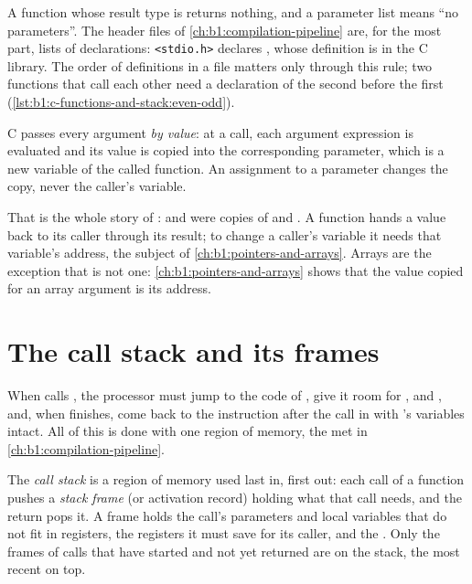 A function whose result type is  returns nothing, and a parameter list  means ``no
parameters''. The header files of \cref{ch:b1:compilation-pipeline} are, for the most part, lists of
declarations: \texttt{<stdio.h>} declares , whose definition is in the C library. The order of
definitions in a file matters only through this rule; two functions that call each other need a declaration of
the second before the first (\cref{lst:b1:c-functions-and-stack:even-odd}).

\begin{definition}\label{def:b1:c-functions-and-stack:by-value}
C passes every argument \emph{by value}: at a call, each argument expression is evaluated
and its value is copied into the corresponding parameter, which is a new variable of the called function. An
assignment to a parameter changes the copy, never the caller's variable.
\end{definition}

That is the whole story of :  and  were copies of  and . A function hands a
value back to its caller through its result; to change a caller's variable it needs that variable's address, the
subject of \cref{ch:b1:pointers-and-arrays}. Arrays are the exception that is not one: \cref{ch:b1:pointers-and-arrays}
shows that the value copied for an array argument is its address.

\section{The call stack and its frames}\label{sec:b1:c-functions-and-stack:stack}

When  calls , the processor must jump to the code of , give it room for
,  and , and, when  finishes, come back to the instruction after the call in
 with 's variables intact. All of this is done with one region of memory, the  met
in \cref{ch:b1:compilation-pipeline}.

\begin{definition}\label{def:b1:c-functions-and-stack:call-stack}
The \emph{call stack} is a region of memory used last in, first out: each call of a function
pushes a \emph{stack frame} (or activation record) holding what that call needs, and the return
pops it. A frame holds the call's parameters and local variables that do not fit in registers, the registers it
must save for its caller, and the . Only the frames of calls that have started and not yet returned
are on the stack, the most recent on top.
\end{definition}


